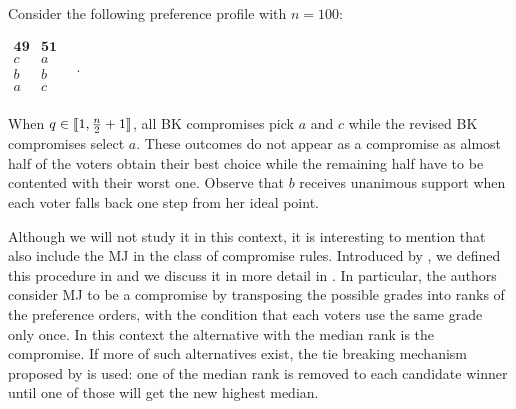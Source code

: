 \begin{example}
	\label{ex:CompromiseGEQ3}
	Consider the following preference profile with $n=100$:
	\begin{center}
		$
		\begin{array}{cc}
			\mathbf{49} & \mathbf{51} \\
			c	&	a	\\
			b	&	b	\\
			a	&	c	\\
		\end{array} \quad.
		$
	\end{center}
	When $q\in \llbracket1,\frac{n}{2}+1\rrbracket $, all BK compromises pick $a$ and $c$ while the revised BK compromises select $a$. These outcomes do not appear as a compromise as almost half of the voters obtain their best choice while the remaining half have to be contented with their worst one. Observe that $b$ receives unanimous support when each voter falls back one step from her ideal point.
\end{example}

Although we will not study it in this context, it is interesting to mention that \citet{Merlin2019} also include the \acl{MJ} in the class of compromise rules. Introduced by \citet{Balinski2007,Balinski2011}, we defined this procedure in  and we discuss it in more detail in . In particular, the authors consider \acs{MJ} to be a compromise by transposing the possible grades into ranks of the preference orders, with the condition that each voters use the same grade only once. In this context the alternative with the median rank is the compromise. If more of such alternatives exist, the tie breaking mechanism proposed by \citet{Balinski2011} is used: one of the median rank is removed to each candidate winner until one of those will get the new highest median.

